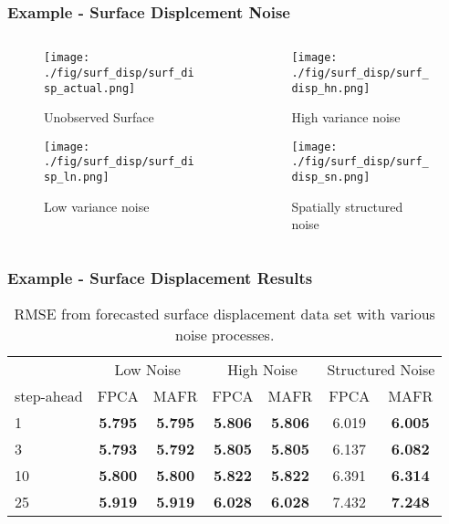 \documentclass[aspectratio=169]{beamer}
\begin{document}
  \begin{frame}
    \frametitle{Example - Surface Displcement Noise}
    \begin{columns}[t]
      \begin{column}{.5\textwidth}
      \begin{figure}
        \texttt{[image: ./fig/surf\_disp/surf\_disp\_actual.png]}
      \caption{Unobserved Surface}
      \end{figure}%
      \begin{figure}
      \texttt{[image: ./fig/surf\_disp/surf\_disp\_ln.png]}
      \caption{Low variance noise}
      \end{figure}
      \end{column}
      \begin{column}{.5\textwidth}
      \begin{figure}
      \texttt{[image: ./fig/surf\_disp/surf\_disp\_hn.png]}
      \caption{High variance noise}
      \end{figure}%
      \begin{figure}
      \texttt{[image: ./fig/surf\_disp/surf\_disp\_sn.png]}
      \caption{Spatially structured noise}
      \end{figure}
      \end{column}
    \end{columns}
  \end{frame}
  
  \begin{frame}
    \frametitle{Example - Surface Displacement Results}
    \begin{table}[h]
        \setlength{\arrayrulewidth}{1.5px}
        \setlength{\tabcolsep}{10pt}
        \centering
        \begin{tabular}{lcccccc} \toprule
            & \multicolumn{2}{c}{Low Noise} & \multicolumn{2}{c}{High Noise} & \multicolumn{2}{c}{Structured Noise} \\
            step-ahead & FPCA & MAFR & FPCA & MAFR & FPCA & MAFR \\ \bottomrule
            1 & \textbf{5.795} & \textbf{5.795} & \textbf{5.806} & \textbf{5.806} & 6.019 & \textbf{6.005} \\
            3 & \textbf{5.793} & \textbf{5.792} & \textbf{5.805} & \textbf{5.805} & 6.137 & \textbf{6.082} \\
            10 & \textbf{5.800} & \textbf{5.800} & \textbf{5.822} & \textbf{5.822} & 6.391 & \textbf{6.314} \\
            25 & \textbf{5.919} & \textbf{5.919} & \textbf{6.028} & \textbf{6.028} & 7.432 & \textbf{7.248} \\
            \bottomrule
        \end{tabular}
        \caption{RMSE from forecasted surface displacement data set with various noise processes.}
    \end{table}
  \end{frame}
\end{document}

